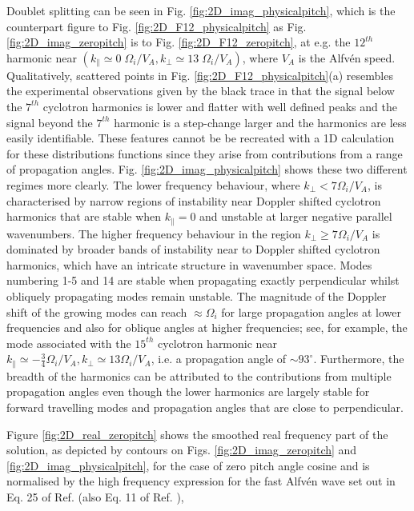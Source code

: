 \documentclass[12pt]{iopart}
\begin{document}
Doublet splitting can be seen in Fig. \ref{fig:2D_imag_physicalpitch}, which is the
counterpart figure to Fig. \ref{fig:2D_F12_physicalpitch} as Fig.
\ref{fig:2D_imag_zeropitch} is to Fig. \ref{fig:2D_F12_zeropitch},
at e.g. the $12^{th}$ harmonic  near $(k_\parallel \simeq 0\; \Omega_{i}/V_A,
k_\bot \simeq 13\; \Omega_{i}/V_A)$, where $V_A$ is the Alfv{\'e}n speed.
Qualitatively, scattered points in Fig.
\ref{fig:2D_F12_physicalpitch}(a) resembles the experimental observations given
by the black trace in that the
signal below the $7^{th}$ cyclotron harmonics is lower and flatter with well
defined peaks and the signal beyond the $7^{th}$ harmonic is a step-change
larger and the harmonics are less easily identifiable. These features cannot be
be recreated with a 1D calculation for these distributions functions
since they arise from contributions from a range of propagation angles.
Fig. \ref{fig:2D_imag_physicalpitch} shows these two different regimes
more clearly. The lower frequency behaviour, where $k_\perp < 7 \Omega_i/V_A$, is
characterised by narrow regions of instability near Doppler shifted cyclotron
harmonics that are stable when $k_\parallel=0$ and unstable at larger
negative parallel wavenumbers. The higher frequency behaviour in the region
$k_\bot \geq 7\Omega_i/V_A$ is dominated by broader bands of instability
near to Doppler shifted cyclotron harmonics, which have
an intricate structure in wavenumber space. Modes numbering 1-5 and
14 are stable when propagating exactly perpendicular whilst obliquely
propagating modes remain unstable. The magnitude of the Doppler shift of
the growing modes can reach $\approx \Omega_i$ for large propagation angles at 
lower frequencies and also for
oblique angles at higher frequencies; see, for example, the mode
associated with the $15^{th}$ cyclotron harmonic near $k_\parallel \simeq
-\frac{3}{4} \Omega_i/V_A, k_\perp \simeq 13 \Omega_i/V_A$, i.e. a propagation
angle of $\sim 93^\circ$. Furthermore, the breadth of the harmonics can be
attributed to the contributions from multiple propagation angles even though the
lower harmonics are largely stable for forward travelling modes and
propagation angles that are close to perpendicular.

Figure \ref{fig:2D_real_zeropitch}
shows the smoothed real frequency part of the solution, as depicted
by contours on Figs. \ref{fig:2D_imag_zeropitch} and
\ref{fig:2D_imag_physicalpitch}, for the case of
zero pitch angle cosine and is normalised by
the high frequency expression for the fast Alfv{\'e}n wave set out in Eq.
25 of Ref. \cite{Dendy1994} (also Eq. 11 of Ref. \cite{McClements1996}),
\end{document}
